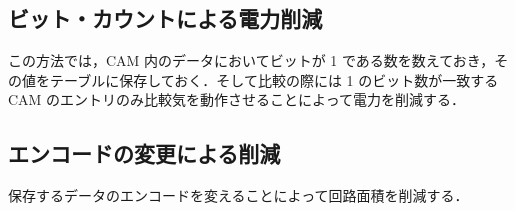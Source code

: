 \documentclass[twocolumn]{jsarticle}
\begin{document}
  \subsection{ビット・カウントによる電力削減}
  この方法では，CAM 内のデータにおいてビットが 1 である数を数えておき，その値をテーブルに保存しておく．そして比較の際には 1 のビット数が一致する CAM のエントリのみ比較気を動作させることによって電力を削減する．
  \subsection{エンコードの変更による削減}
  保存するデータのエンコードを変えることによって回路面積を削減する． 
  
  
   
  
  
  
\end{document}
